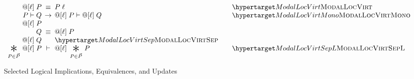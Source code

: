 \begin{figure}
  \[
  \begin{array}{r@{\;}c@{\;}lll}
\modaldef\ell\modalP
& \logequiv &
\modaldefunfold\ell\modalP
&& \TirNameStyle{ModalLocVirt}
\\

\modalP \vdash \modalQ & \rightarrow & \modaldef\ell\modalP \vdash \modaldef\ell\modalQ && \TirNameStyle{ModalLocVirtMono}
\\

\modaldef\ell{\modalstar\modalP\modalQ} & \logequiv & \modaldef\ell\modalP \star \modaldef\ell\modalQ &&\TirNameStyle{ModalLocVirtSep}
\\

   \bigast{\modalP \in \modalPs\modalP} { \modaldef\ell\modalP } & \vdash &
   \modaldef\ell{\bigast{\modalP \in \modalPs\modalP} {\modalP}} && \TirNameStyle{ModalLocVirtSepL}
  \end{array}
  \]
\caption{Selected Logical Implications, Equivalences, and Updates}
\label{fig:laws}
\end{figure}
